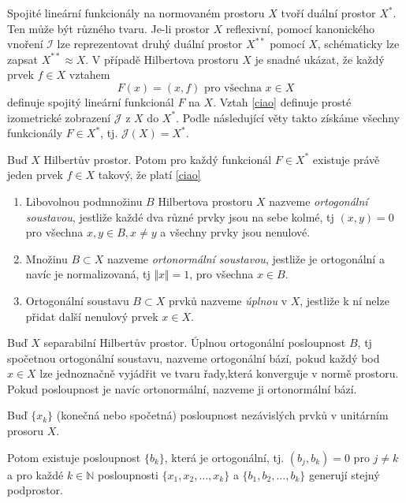 \begin{notes}
	Spojité lineární funkcionály na normovaném prostoru $X$ tvoří duální prostor $X^*$. Ten může být různého tvaru. Je-li prostor $X$ reflexivní, pomocí kanonického vnoření $\mathscr{I}$ lze reprezentovat druhý duální prostor $X^{**}$ pomocí $X$, schématicky lze zapsat $X^{**}\approx X$. V případě Hilbertova prostoru $X$ je snadné ukázat, že každý prvek $f \in X$ vztahem \begin{equation}\label{ciao}
		F(x)=(x,f) \text{       pro všechna     } x\in X
	\end{equation}
	definuje spojitý lineární funkcionál $F$ na $X$. Vztah \eqref{ciao} definuje prosté izometrické zobrazení $\mathscr{J} $ z $X$ do $X^*$. Podle následující věty takto získáme všechny funkcionály $F\in X^*$, tj. $\mathscr{J}(X)=X^*.$
\end{notes}
\begin{theorem}
	Buď $X$ Hilbertův prostor. Potom pro každý funkcionál $F\in X^*$ existuje právě jeden prvek $f\in X$ takový, že platí \eqref{ciao}
\end{theorem}
\begin{definition}
\begin{enumerate}
	\item Libovolnou podmnožinu $B$ Hilbertova prostoru $X$ nazveme \textit{ortogonální soustavou}, jestliže každé dva různé prvky jsou na sebe kolmé, tj $(x,y)=0$ pro všechna $x,y\in B, x\neq y$ a všechny prvky jsou nenulové.
	\item Množinu $B \subset X$ nazveme \textit{ortonormální soustavou}, jestliže je ortogonální a navíc je normalizovaná, tj $\Vert x\Vert=1$, pro všechna $x\in B$.
	\item Ortogonální soustavu $B\subset X $ prvků nazveme \textit{úplnou} v $X$, jestliže k ní nelze přidat další nenulový prvek $x\in X$.
\end{enumerate}
\end{definition}

\begin{definition}
	Buď $X$ separabilní Hilbertův prostor. Úplnou ortogonální posloupnost $B$, tj spočetnou ortogonální soustavu, nazveme ortogonální bází, pokud každý bod $x\in X$ lze jednoznačně vyjádřit ve tvaru řady,která konverguje v normě prostoru. Pokud posloupnost je navíc ortonormální, nazveme ji ortonormální bází.
\end{definition}

\begin{theorem}
Buď $\{x_k\}$ (konečná nebo spočetná) posloupnost nezávislých prvků v unitárním prosoru $X$. 

Potom existuje posloupnost $\{b_k\}$, která je ortogonální, tj. $(b_j,b_k)=0$ pro $j\neq k$ a pro každé $k\in \mathbb{N}$ posloupnosti $\{x_1,x_2,\ldots,x_k\}$ a $\{b_1,b_2,\ldots,b_k\}$ generují stejný podprostor.  
	
\end{theorem}

